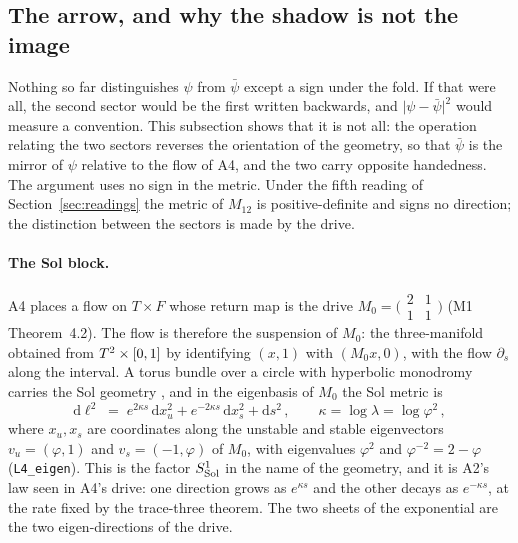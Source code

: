 
\subsection{The arrow, and why the shadow is not the image}\label{sec:handedness}

Nothing so far distinguishes $\psi$ from $\bar\psi$ except a sign under the
fold. If that were all, the second sector would be the first written
backwards, and $\lvert\psi-\bar\psi\rvert^{2}$ would measure a convention. This
subsection shows that it is not all: the operation relating the two sectors
reverses the orientation of the geometry, so that $\bar\psi$ is the mirror of
$\psi$ relative to the flow of A4, and the two carry opposite handedness. The
argument uses no sign in the metric. Under the fifth reading of
Section~\ref{sec:readings} the metric of $M_{12}$ is positive-definite and
signs no direction; the distinction between the sectors is made by the drive.

\paragraph{The Sol block.}
A4 places a flow on $T\times F$ whose return map is the drive
$M_{0}=\bigl(\begin{smallmatrix}2&1\\1&1\end{smallmatrix}\bigr)$
(M1 Theorem~4.2). The flow is therefore the suspension of $M_{0}$: the
three-manifold obtained from $T^2\times[0,1]$ by identifying $(x,1)$ with
$(M_{0}x,0)$, with the flow $\partial_{s}$ along the interval. A torus bundle
over a circle with hyperbolic monodromy carries the Sol geometry
\cite{Thurston}, and in the eigenbasis of $M_{0}$ the Sol metric is
\begin{equation}\label{eq:sol-metric}
  \mathrm{d}\ell^{2}
  \;=\;e^{2\kappa s}\,\mathrm{d}x_{u}^{2}+e^{-2\kappa s}\,\mathrm{d}x_{s}^{2}
  +\mathrm{d}s^{2}\,,
  \qquad \kappa=\log\lambda=\log\varphi^{2}\,,
\end{equation}
where $x_{u},x_{s}$ are coordinates along the unstable and stable
eigenvectors $v_{u}=(\varphi,1)$ and $v_{s}=(-1,\varphi)$ of $M_{0}$, with
eigenvalues $\varphi^{2}$ and $\varphi^{-2}=2-\varphi$
(\texttt{L4\_eigen}). This is the factor $S^{1}_{\mathrm{Sol}}$ in the name of the
geometry, and it is A2's law seen in A4's drive: one direction grows as
$e^{\kappa s}$ and the other decays as $e^{-\kappa s}$, at the rate fixed by
the trace-three theorem. The two sheets of the exponential are the two
eigen-directions of the drive. \rigD

